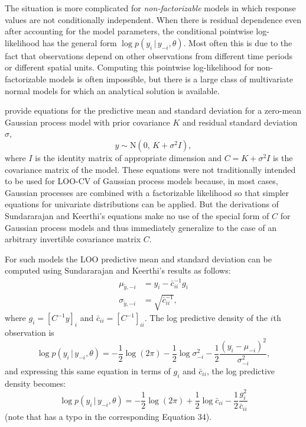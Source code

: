 \documentclass[11pt]{article}
\begin{document}
The situation is more complicated for \emph{non-factorizable} models in which
response values are not conditionally independent. When there is residual
dependence even after accounting for the model parameters, the
conditional pointwise log-likelihood has the general form $\log p(y_i \,|\, y_{-i}, \theta)$.
Most often this is due to the fact that observations depend on other observations from 
different time periods or different spatial units. Computing this pointwise log-likelihood for 
non-factorizable models is often impossible, but there is a large class of multivariate normal 
models for which an analytical solution is available. 

\cite{sundararajan2001} provide equations for the predictive mean and standard deviation 
for a zero-mean Gaussian process model with prior covariance $K$ and residual standard 
deviation $\sigma$,
%
\begin{equation}
y \sim {\mathrm N}(0, \, K+\sigma^2 I),
\end{equation}
%
where $I$ is the identity matrix of appropriate dimension and $C = K+\sigma^2 I$
is the covariance matrix of the model. These equations were not traditionally intended 
to be used for LOO-CV of Gaussian process models because, in most cases,
Gaussian processes are combined with a factorizable likelihood so that simpler
equations for univariate distributions can be applied. But the derivations of Sundararajan and Keerthi's 
equations make no use of the special form of $C$ for Gaussian process models and thus immediately 
generalize to the case of an arbitrary invertible covariance matrix $C$. 

For such models the LOO predictive mean and standard deviation can be computed 
using Sundararajan and Keerthi's results as follows:
%
\begin{align}
\label{ypredpars}
  \mu_{\tilde{y},-i} &= y_i-\bar{c}_{ii}^{-1} g_i \nonumber \\
  \sigma_{\tilde{y},-i} &= \sqrt{\bar{c}_{ii}^{-1}},
\end{align}
%
where $g_i = \left[C^{-1} y\right]_i$ and $\bar{c}_{ii} = \left[C^{-1}\right]_{ii}$. 
The log predictive density of the $i$th observation is 
\begin{equation}
  \log p(y_i \,|\, y_{-i},\theta)
  = - \frac{1}{2}\log(2\pi)
  - \frac{1}{2}\log \sigma^2_{-i}
  - \frac{1}{2}\frac{(y_i-\mu_{-i})^2}{\sigma^2_{-i}},
\end{equation}
%
and expressing this same equation in terms of $g_i$ and $\bar{c}_{ii}$, the log
predictive density becomes:
%
\begin{equation}
\label{logpointwise}
  \log p(y_i \,|\, y_{-i},\theta)
  = - \frac{1}{2}\log(2\pi)
  + \frac{1}{2}\log \bar{c}_{ii}
  - \frac{1}{2}\frac{g_i^2}{\bar{c}_{ii}}
\end{equation}
%
(note that \cite{vehtari2016} has a typo in the corresponding Equation 34). 
\end{document}

